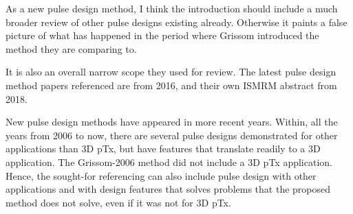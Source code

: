 \documentclass[11pt]{article}
\begin{document}
 As a new pulse design method, I think the introduction should include a much broader review of other pulse designs existing already. Otherwise it paints a false picture of what has happened in the period where Grissom introduced the method they are comparing to.

It is also an overall narrow scope they used for review. The latest pulse design method papers referenced are from 2016, and their own ISMRM abstract from 2018.

New pulse design methods have appeared in more recent years. Within, all the years from 2006 to now, there are several pulse designs demonstrated for other applications than 3D pTx, but have features that translate readily to a 3D application. The Grissom-2006 method did not include a 3D pTx application. Hence, the sought-for referencing can also include pulse design with other applications and with design features that solves problems that the proposed method does not solve, even if it was not for 3D pTx.
\\[0.2em]
\indent{\it \textcolor{blue}{While we are above our word count and cannot add a broad overview of different parallel transmit pulse design methods
to the Introduction,
we have added 10 more citations to the work including two review articles on parallel transmission (Deniz 2019 and Padormo 2015).
We also added brief Discussion on possible extensions of the method for large-tip-angle and VERSE parallel transmit pulse designs.}}
\\[1.2em]
\end{document}
